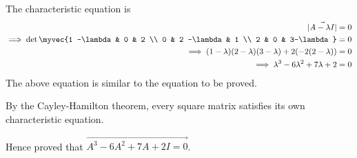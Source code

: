 The characteristic equation is 
\begin{align}
    \vec{|A - \lambda I|} = 0 
\\
    \implies \det\myvec{1 -\lambda & 0 & 2 \\ 0 & 2 -\lambda & 1 \\ 2 & 0 & 3-\lambda} = 0  
    \\ 
\implies (1-\lambda)(2-\lambda)(3-\lambda) + 2(-2(2-\lambda)) = 0
    \\ 
\implies \lambda^3 - 6\lambda^2 + 7\lambda + 2 = 0
\end{align}
The above equation is similar to the equation to be proved. 

By the Cayley-Hamilton theorem, every square matrix satisfies its own characteristic equation. 

Hence proved that $\vec{A^3 - 6A^2 + 7A + 2I = 0}$.







